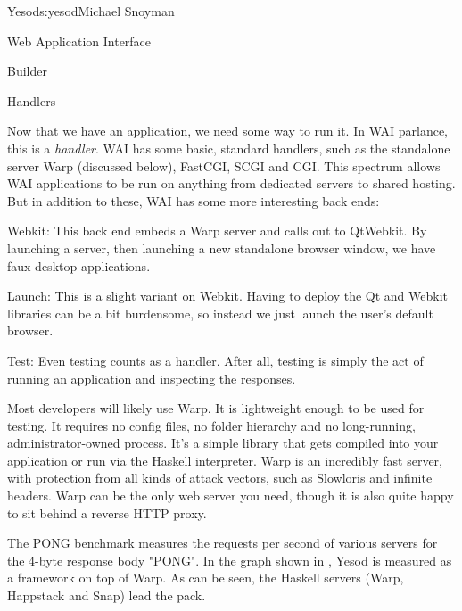 \begin{aosachapter}{Yesod}{s:yesod}{Michael Snoyman}
\begin{aosasect1}{Web Application Interface}
\begin{aosasect2}{Builder}
\end{aosasect2}

\begin{aosasect2}{Handlers}

Now that we have an application, we need some way to run it. In WAI
parlance, this is a \emph{handler}. WAI has some basic, standard
handlers, such as the standalone server Warp (discussed below),
FastCGI, SCGI and CGI. This spectrum allows WAI applications to be run
on anything from dedicated servers to shared hosting. But in
addition to these, WAI has some more interesting back ends:

\begin{aosadescription}
  
\item{Webkit:} This back end embeds a Warp server and calls out to
  QtWebkit. By launching a server, then launching a new
  standalone browser window, we have faux desktop applications.

\item{Launch:} This is a slight variant on Webkit. Having to deploy
  the Qt and Webkit libraries can be a bit burdensome, so instead we
  just launch the user's default browser.

\item{Test:} Even testing counts as a handler. After all, testing is
  simply the act of running an application and inspecting the
  responses.

\end{aosadescription}

Most developers will likely use Warp. It is lightweight enough to be
used for testing. It requires no config files, no folder hierarchy and
no long-running, administrator-owned process. It's a simple library
that gets compiled into your application or run via the Haskell
interpreter. Warp is an incredibly fast server, with
protection from all kinds of attack vectors, such as Slowloris and
infinite headers. Warp can be the only web server you need, though it
is also quite happy to sit behind a reverse HTTP proxy.

The PONG benchmark measures the requests per second of various servers
for the 4-byte response body "PONG". In the graph shown in , Yesod is measured
as a framework on top of Warp. As can be seen, the Haskell servers
(Warp, Happstack and Snap) lead the pack.



\end{aosasect2}
\end{aosasect1}
\end{aosachapter}

